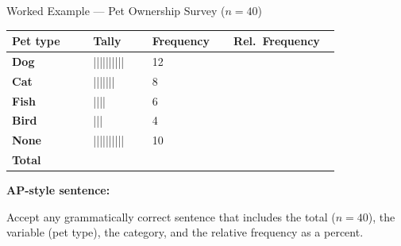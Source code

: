 \documentclass[10pt]{article}
\begin{document}
\begin{notesbox}{Worked Example --- Pet Ownership Survey ($n = 40$)}
\small

\renewcommand{\arraystretch}{1.8}
\begin{tabularx}{\linewidth}{@{} >{\bfseries}p{0.22\linewidth}
                                    C{0.16\linewidth}
                                    C{0.22\linewidth}
                                    C{0.22\linewidth} @{}}
\textbf{Pet type} & \textbf{Tally} & \textbf{Frequency} & \textbf{Rel.\ Frequency} \\
\midrule
Dog    & \small||||||||||  & 12 &  \\
Cat    & \small|||||||     & 8  &  \\
Fish   & \small||||        & 6  &  \\
Bird   & \small|||         & 4  &  \\
None   & \small||||||||||  & 10 &  \\
\midrule
{}\textbf{Total} & &  &  \\
\end{tabularx}

\vspace{10pt}
\textbf{AP-style sentence:}\\[4pt]

\begin{teachernote}
Accept any grammatically correct sentence that includes the total ($n = 40$),
the variable (pet type), the category, and the relative frequency as a percent.
\end{teachernote}
\end{notesbox}

\newpage
\end{document}
